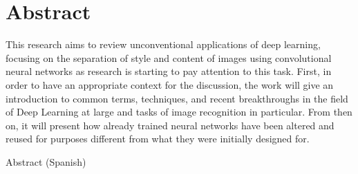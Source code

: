 
\chapter*{Abstract}
\label{sec:abstract}

\vspace*{-10mm}
This research aims to review unconventional applications of deep learning, focusing on the separation of style and content of images using convolutional neural networks as research is starting to pay attention to this task.
First, in order to have an appropriate context for the discussion, the work will give an introduction to common terms, techniques, and recent breakthroughs in the field of Deep Learning at large and tasks of image recognition in particular.
From then on, it will present how already trained neural networks have been altered and reused for purposes different from what they were initially designed for.

\vspace*{20mm}

{Abstract (Spanish)}\label{sec:abstract-diff} \\

